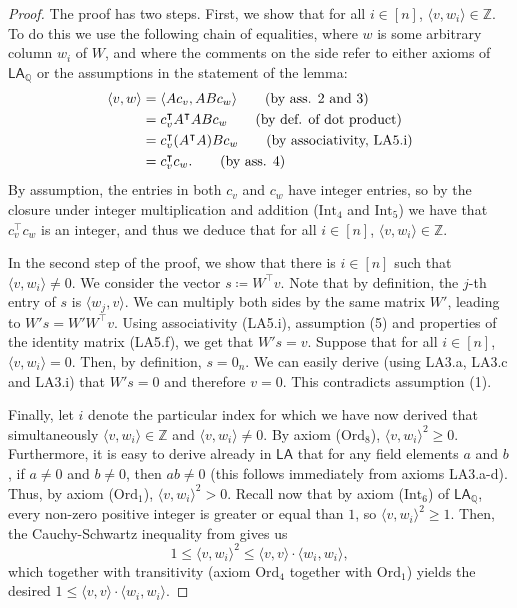 \documentclass[11pt]{article}
\newcommand{\LA}{\mathsf{LA}}
\newcommand{\LAQ}{\mathsf{LA}_\mathbb{Q}}
\theoremstyle{definition}
\theoremstyle{plain}
\theoremstyle{remark}
\newcommand{\bZ}{\mathbb{Z}}
\begin{document}
\begin{proof}
The proof has two steps. First, we show that for all $i\in[n]$, $\langle v ,w_i\rangle\in\mathbb{Z}$. To do this we use the following chain of equalities, where $w$ is some arbitrary column $w_i$ of $W$, and where the comments on the side refer to either axioms of $\LAQ$ or the assumptions in the statement of the lemma:
\begin{align}
     \langle v ,w\rangle    &=\langle Ac_v, ABc_w\rangle \tag{\text{by ass. 2 and 3}} \\   
        &= c_v^\intercal A^\intercal  ABc_w              \tag{\text{by def. of dot product}} \\
          &=  c_v^\intercal (A^\intercal A)Bc_w \tag{\text{by associativity, LA5.i}} \\
            &= c_v^\intercal c_w \text{.} \tag{by ass. 4}
\end{align}
By assumption, the entries in both $c_v$ and $c_w$ have integer entries, so by the closure under integer multiplication and addition ($\text{Int}_4$ and $\text{Int}_5$) we have that $c_v^\intercal c_w$ is an integer, and thus we deduce that for all $i \in[n]$, $\langle v ,w_i\rangle\in\mathbb{Z}$.

In the second step of the proof, we show that there is $i \in[n]$ such that $\langle v ,w_i\rangle\neq 0$. We consider the vector $s  \coloneqq  W^\intercal v$. Note that by definition, the $j$-th entry of $s$ is $\langle w_j,v\rangle$. We can multiply both sides by the same matrix $W'$, leading to $W's=W'W^\intercal v$. Using associativity (LA5.i), assumption (5) and properties of the identity matrix (LA5.f), we get that $W's=v$. Suppose that for all $i\in[n]$, $\langle v ,w_i\rangle=0$. Then, by definition, $s=0_n$. We can easily derive (using LA3.a, LA3.c and LA3.i) that $W's=0$ and therefore $v=0$. This contradicts assumption (1). 

Finally, let $i$ denote the particular index for which we have now derived that simultaneously $\langle v, w_i \rangle \in \bZ$ and $\langle v, w_i\rangle \neq 0$. By axiom ($\text{Ord}_8$), $\langle v, w_i\rangle^2 \geq 0$. Furthermore, it is easy to derive already in $\LA$ that for any field elements $a$ and $b$, if $a\neq 0$ and $b \neq 0$, then $ab \neq 0$ (this follows immediately from axioms LA3.a-d). Thus, by axiom ($\text{Ord}_1$), $\langle v, w_i\rangle^2 > 0$. Recall now that by axiom ($\text{Int}_6$) of $\LAQ$, every non-zero positive integer is greater or equal than $1$, so $\langle v, w_i\rangle^2 \geq 1$. Then, the Cauchy-Schwartz inequality from  gives us
\[ 1 \leq \langle v, w_i\rangle^2 \leq \langle v, v \rangle \cdot \langle w_i, w_i \rangle,
 \]
which together with transitivity (axiom $\text{Ord}_4$ together with $\text{Ord}_1$) yields the desired $1 \leq \langle v, v \rangle \cdot \langle w_i, w_i \rangle$.
\end{proof}
\end{document}
